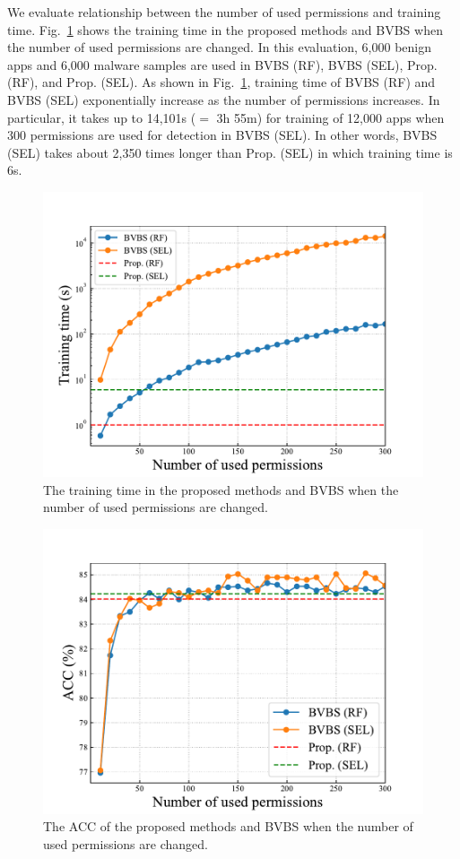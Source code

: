 \documentclass{ieeeaccess}
\newcommand{\myfigurename}{Fig.}
\begin{document}
We evaluate relationship between the number of used permissions and training time.
\myfigurename~\ref{fig:perm_time} shows the training time in the proposed methods and BVBS when the number of used permissions are changed.
In this evaluation, 6,000 benign apps and 6,000 malware samples are used in BVBS (RF), BVBS (SEL), Prop. (RF), and Prop. (SEL).
As shown in \myfigurename~\ref{fig:perm_time}, training time of BVBS (RF) and BVBS (SEL) exponentially increase as the number of permissions increases.
In particular, it takes up to 14,101s ($=$ 3h 55m) for training of 12,000 apps when 300 permissions are used for detection in BVBS (SEL).
In other words, BVBS (SEL) takes about 2,350 times longer than Prop. (SEL) in which training time is 6s.
\begin{figure}[t]
  \centering
  \includegraphics[scale=0.44]{./figures/csv_time.pdf}
  \caption{The training time in the proposed methods and BVBS when the number of used permissions are changed.}
  \label{fig:perm_time}
\end{figure}
\begin{figure}[t]
  \centering
  \includegraphics[scale=0.45]{./figures/perm_acc.pdf}
  \caption{The ACC of the proposed methods and BVBS when the number of used permissions are changed.}
  \label{fig:perm_acc}
\end{figure}
\end{document}
